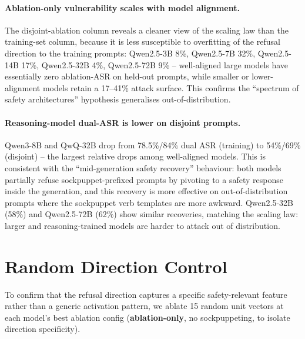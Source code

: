\documentclass{article}
\begin{document}
\paragraph{Ablation-only vulnerability scales with model alignment.}
The disjoint-ablation column reveals a cleaner view of the scaling law than the training-set column, because it is less susceptible to overfitting of the refusal direction to the training prompts: Qwen2.5-3B 8\%, Qwen2.5-7B 32\%, Qwen2.5-14B 17\%, Qwen2.5-32B 4\%, Qwen2.5-72B 9\% -- well-aligned large models have essentially zero ablation-ASR on held-out prompts, while smaller or lower-alignment models retain a 17--41\% attack surface. This confirms the ``spectrum of safety architectures'' hypothesis generalises out-of-distribution.

\paragraph{Reasoning-model dual-ASR is lower on disjoint prompts.}
Qwen3-8B and QwQ-32B drop from 78.5\%/84\% dual ASR (training) to 54\%/69\% (disjoint) -- the largest relative drops among well-aligned models. This is consistent with the ``mid-generation safety recovery'' behaviour: both models partially refuse sockpuppet-prefixed prompts by pivoting to a safety response inside the generation, and this recovery is more effective on out-of-distribution prompts where the sockpuppet verb templates are more awkward. Qwen2.5-32B (58\%) and Qwen2.5-72B (62\%) show similar recoveries, matching the scaling law: larger and reasoning-trained models are harder to attack out of distribution.

\section{Random Direction Control}
\label{app:randdir}

To confirm that the refusal direction captures a specific safety-relevant feature rather than a generic activation pattern, we ablate 15 random unit vectors at each model's best ablation config (\textbf{ablation-only}, no sockpuppeting, to isolate direction specificity).
\end{document}
